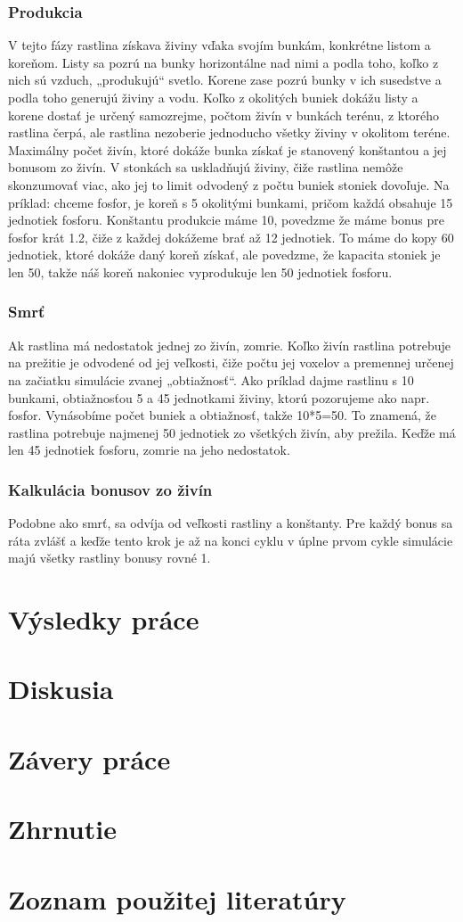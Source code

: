 \documentclass[12pt]{article}
\begin{document}
\subsubsection{Produkcia}

V tejto fázy rastlina získava živiny vďaka svojím bunkám, konkrétne listom
a koreňom. Listy sa pozrú na bunky horizontálne nad nimi a podla toho, koľko
z nich sú vzduch, „produkujú“ svetlo. Korene zase pozrú bunky v ich susedstve
a podla toho generujú živiny a vodu. Koľko z okolitých buniek dokážu listy
a korene dostať je určený samozrejme, počtom živín v bunkách terénu, z ktorého
rastlina čerpá, ale rastlina nezoberie jednoducho všetky živiny v okolitom
teréne. Maximálny počet živín, ktoré dokáže bunka získať je stanovený
konštantou a jej bonusom zo živín. V stonkách sa uskladňujú živiny, čiže
rastlina nemôže skonzumovať viac, ako jej to limit odvodený z počtu buniek
stoniek dovoľuje. Na príklad: chceme fosfor, je koreň s 5 okolitými bunkami,
pričom každá obsahuje 15 jednotiek fosforu. Konštantu produkcie máme 10,
povedzme že máme bonus pre fosfor krát 1.2, čiže z každej dokážeme brať až 12
jednotiek. To máme do kopy 60 jednotiek, ktoré dokáže daný koreň získať,
ale povedzme, že kapacita stoniek je len 50, takže náš koreň nakoniec
vyprodukuje len 50 jednotiek fosforu.

\subsubsection{Smrť}

Ak rastlina má nedostatok jednej zo živín, zomrie. Koľko živín rastlina
potrebuje na prežitie je odvodené od jej veľkosti, čiže počtu jej voxelov
a premennej určenej na začiatku simulácie zvanej „obtiažnosť“. Ako príklad
dajme rastlinu s 10 bunkami, obtiažnosťou 5 a 45 jednotkami živiny, ktorú
pozorujeme ako napr. fosfor. Vynásobíme počet buniek a obtiažnosť, takže
10*5=50. To znamená, že rastlina potrebuje najmenej 50 jednotiek zo všetkých
živín, aby prežila. Keďže má len 45 jednotiek fosforu, zomrie na jeho
nedostatok.

\subsubsection{Kalkulácia bonusov zo živín}

Podobne ako smrť, sa odvíja od veľkosti rastliny a konštanty. Pre každý bonus
sa ráta zvlášť a keďže tento krok je až na konci cyklu v úplne prvom cykle
simulácie majú všetky rastliny bonusy rovné 1.

\section{Výsledky práce}
\section{Diskusia}
\section{Závery práce}
\section{Zhrnutie}
\section{Zoznam použitej literatúry}
\end{document}
